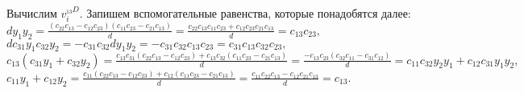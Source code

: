 Вычислим $v_i^{_{13}D}$. Запишем вспомогательные равенства, которые понадобятся далее:
\\
$ d y_1 y_2 = \frac{ (c_{22}c_{13} - c_{12}c_{23}) (c_{11}c_{23} - c_{21}c_{13}) }{d} = \frac{ c_{22}c_{13}c_{11}c_{23} + c_{12}c_{23}c_{21}c_{13} }{d} = c_{13}c_{23}, $
\\
$ d c_{31} y_1 c_{32} y_2 = - c_{31}c_{32} d y_1 y_2 = - c_{31}c_{32}c_{13}c_{23} = c_{31}c_{13}c_{32}c_{23}, $
\\
$ c_{13} (c_{31} y_1 + c_{32} y_2) = \frac{c_{13}c_{31} (c_{22}c_{13} - c_{12}c_{23}) + c_{13}c_{32} (c_{11}c_{23} - c_{21}c_{13}) }{d} = \frac{-c_{13}c_{23} (c_{32}c_{11} - c_{31}c_{12})}{d} = c_{11} c_{32} y_2 y_1 + c_{12}c_{31} y_1 y_2, $
\\
$ c_{11} y_1 + c_{12} y_2 = \frac{c_{11} (c_{22}c_{13} - c_{12}c_{23}) + c_{12} (c_{11}c_{23} - c_{21}c_{13}) }{d} = 
\frac{ c_{11}c_{22}c_{13} - c_{12}c_{21}c_{13} }{d} = c_{13}. $

